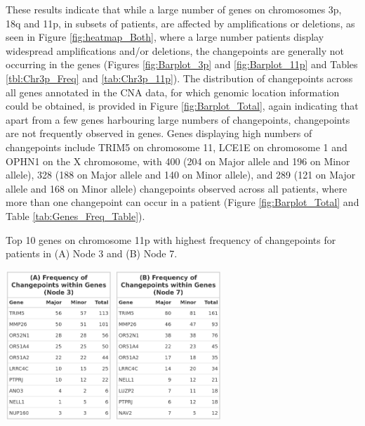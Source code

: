These results indicate that while a large number of genes on chromosomes 3p, 18q and 11p, in subsets of patients, are affected by amplifications or deletions, as seen in Figure \ref{fig:heatmap_Both}, where a large number patients display widespread amplifications and/or deletions, the changepoints are generally not occurring in the genes (Figures \ref{fig:Barplot_3p} and \ref{fig:Barplot_11p} and Tables \ref{tbl:Chr3p_Freq} and \ref{tab:Chr3p_11p}). The distribution of changepoints across all genes annotated in the CNA data, for which genomic location information could be obtained, is provided in Figure \ref{fig:Barplot_Total}, again indicating that apart from a few genes harbouring large numbers of changepoints, changepoints are not frequently observed in genes. Genes displaying high numbers of changepoints include TRIM5 on chromosome 11, LCE1E on chromosome 1 and OPHN1 on the X chromosome, with 400 (204 on Major allele and 196 on Minor allele), 328 (188 on Major allele and 140 on Minor allele), and 289 (121 on Major allele and 168 on Minor allele) changepoints observed across all patients, where more than one changepoint can occur in a patient (Figure \ref{fig:Barplot_Total} and Table \ref{tab:Genes_Freq_Table}).

\begin{table}[!htb]
\caption[Top 10 genes on chromosome 11p with highest frequency of changepoints for patients in Nodes 3 and 7.]{Top 10 genes on chromosome 11p with highest frequency of changepoints for patients in (A) Node 3 and (B) Node 7.}
\centering
\includegraphics[width = 0.3\textwidth]{../tables/Chapter_6/Chr11_Node_3.png}
\hspace{1cm}
\includegraphics[width = 0.3\textwidth]{../tables/Chapter_6/Chr11_Node_7.png}
\label{tab:Chr3p_11p}
\end{table}


